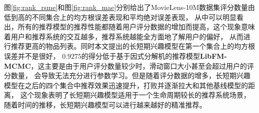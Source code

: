 图\ref{fig:rank_rsme}和图\ref{fig:rank_mae}分别给出了MovieLens-10M数据集评分数量由低到高的不同集合上的均方根误差表现和平均绝对误差表现，
从中可以明显看出，所有的推荐模型的推荐性能都随着用户评分数据的增加而提高，这个现象意味着用户和推荐系统的交互越多，推荐系统越能全方面地了解用户的偏好，
从而进行推荐更高的物品列表。同时本文提出的长短期兴趣模型在第一个集合上的均方根误差并不是很好，
$0.9275$的得分低于基于因式分解机的推荐模型\textbf{LibFM-MCMC}，这主要是由于用户评分数量较少时，滑动窗口大小甚至会超过用户的评分数量，
会导致无法充分进行参数学习。但是随着评分数据的增多，长短期兴趣模型在之后的四个集合中推荐效果迅速提升，打败并逐渐拉大和其他基线模型的距离，
这个现象表明了长短期兴趣模型适用于一个生命周期较长的推荐系统场景，随着时间的推移，长短期兴趣模型可以进行越来越好的精准推荐。


